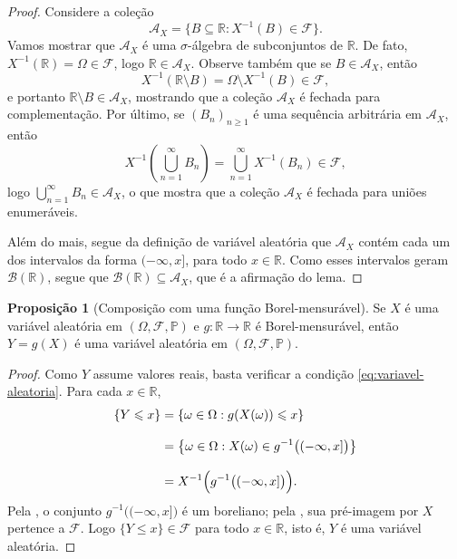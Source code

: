 \documentclass[12pt,portuguese]{article}
\theoremstyle{definition}
\newtheorem{proposition}[proposition]{Proposição}
\theoremstyle{plainexercise}
\theoremstyle{starredexercise}
\theoremstyle{definition}
\begin{document}
\begin{proof}
Considere a coleção
\[
  \mathcal{A}_X=\{B\subseteq\mathbb{R}:X^{-1}(B)\in\mathcal{F}\}.
\]
Vamos mostrar que $\mathcal{A}_X$ é uma $\sigma$-álgebra de subconjuntos de
$\mathbb{R}$. De fato, $X^{-1}(\mathbb{R})=\Omega\in\mathcal{F}$, logo
$\mathbb{R}\in\mathcal{A}_X$. Observe também que se $B\in\mathcal{A}_X$, então
\[
  X^{-1}(\mathbb{R}\setminus B)
  =\Omega\setminus X^{-1}(B)\in\mathcal{F},
\]
e portanto $\mathbb{R}\setminus B\in\mathcal{A}_X$, mostrando que a coleção
$\mathcal{A}_X$ é fechada para complementação. Por último, se $(B_n)_{n\geqslant1}$ é
uma sequência arbitrária em $\mathcal{A}_X$, então
\[
  X^{-1}\!\left(\bigcup_{n=1}^{\infty}B_n\right)
  =\bigcup_{n=1}^{\infty}X^{-1}(B_n)\in\mathcal{F},
\]
logo $\bigcup_{n=1}^{\infty}B_n\in\mathcal{A}_X$, o que mostra que a coleção 
$\mathcal{A}_X$ é fechada para uniões enumeráveis.


\bigskip 
Além do mais, segue da definição de variável
aleatória que $\mathcal{A}_X$ contém cada um dos intervalos da forma $(-\infty,x]$, para todo
$x\in\mathbb{R}$. Como esses intervalos geram $\mathscr{B}(\mathbb{R})$,
segue que $\mathscr{B}(\mathbb{R})\subseteq\mathcal{A}_X$, que é a afirmação
do lema.
\end{proof}

\begin{proposition}[Composição com uma função Borel-mensurável]
\label{prop:composicao-borel}
Se $X$ é uma variável aleatória em $(\Omega,\mathcal{F},\mathbb{P})$ e
$g:\mathbb{R}\to\mathbb{R}$ é Borel-mensurável, então $Y=g(X)$ é uma variável
aleatória em $(\Omega,\mathcal{F},\mathbb{P})$.
\end{proposition}

\begin{proof}
Como $Y$ assume valores reais, basta verificar a condição
\eqref{eq:variavel-aleatoria}. Para cada $x\in\mathbb{R}$,
\[
\begin{aligned}
\{Y\leqslant x\}
&=\{\omega\in\Omega:g(X(\omega))\leqslant x\}
\\[0.3cm]
&=\left\{\omega\in\Omega:X(\omega)\in g^{-1}\bigl((-\infty,x]\bigr)\right\}
\\[0.3cm]
&=X^{-1}\Bigl(g^{-1}\bigl((-\infty,x]\bigr)\Bigr).
\end{aligned}
\]
Pela , o conjunto
$g^{-1}\bigl((-\infty,x]\bigr)$ é um boreliano; pela
, sua pré-imagem por $X$ pertence a
$\mathcal{F}$. Logo $\{Y\leqslant x\}\in\mathcal{F}$ para todo
$x\in\mathbb{R}$, isto é, $Y$ é uma variável aleatória.
\end{proof}
\end{document}

